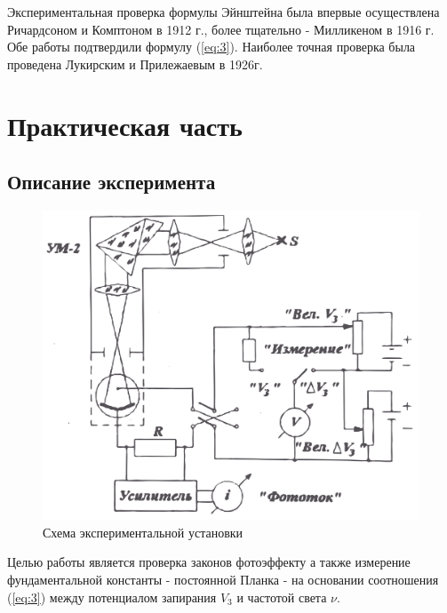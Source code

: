 Экспериментальная проверка формулы Эйнштейна была впервые осуществлена Ричардсоном и Комптоном в 1912 г., более тщательно - Милликеном в 1916 г. Обе работы подтвердили формулу (\ref{eq:3}). Наиболее точная проверка была проведена Лукирским и Прилежаевым в 1926г.

\section{Практическая часть}
\subsection{Описание эксперимента}
\begin{figure}[h]
	\centering
	\includegraphics[width=\linewidth]{fig/fig2.png}
	\caption{Схема экспериментальной установки}
	\label{fig:2}
\end{figure}

Целью работы является проверка законов фотоэффекту а также измерение фундаментальной константы - постоянной Планка - на основании соотношения (\ref{eq:3}) между потенциалом запирания $V_{3}$ и частотой света $\nu$.

